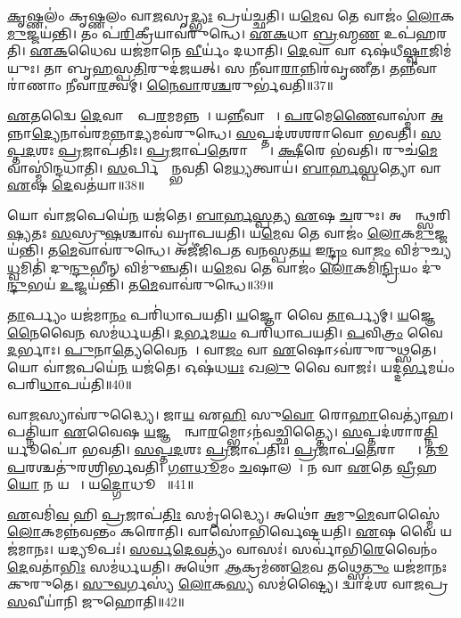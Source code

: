 \ul{𑌕𑍃}𑌷𑍍𑌣𑌲𑌂॑ 𑌕𑍃𑌷𑍍𑌣𑌲𑌂 𑌵𑌾\ul{𑌜}𑌸𑍃\ul{𑌦𑍍𑌭𑍍𑌯𑌃} 𑌪𑍍𑌰𑌯॑𑌚𑍍𑌛𑌤𑌿।
𑌯\ul{𑌮𑍇}𑌵 𑌤𑍇 𑌵𑌾𑌜𑌂॑ \ul{𑌲𑍋}𑌕\ul{𑌮𑍁}𑌜𑍍𑌜𑌯॑𑌨𑍍𑌤𑌿।
𑌤𑌂 𑌪॑\ul{𑌰𑌿}𑌕𑍍𑌰𑍀𑌯𑌾𑌵॑𑌰𑍁𑌨𑍍𑌧𑍇।
\ul{𑌏}\ul{𑌕}𑌧𑌾 \ul{𑌬𑍍𑌰}𑌹𑍍𑌮\ul{𑌣} 𑌉𑌪॑𑌹𑌰𑌤𑌿।
\ul{𑌏}\ul{𑌕}𑌧𑍈𑌵 𑌯𑌜॑𑌮𑌾𑌨𑍇 \ul{𑌵𑍀}𑌰𑍍𑌯𑌂॑ 𑌦𑌧𑌾𑌤𑌿।
\ul{𑌦𑍇}𑌵𑌾 𑌵𑌾 𑌓𑌷॑𑌧𑍀\ul{𑌷𑍍𑌵𑌾}𑌜𑌿𑌮॑𑌯𑍁𑌃।
𑌤𑌾 𑌬𑍃\ul{𑌹}𑌸𑍍𑌪\ul{𑌤𑌿}𑌰𑍁𑌦॑𑌜𑌯𑌤𑍍।
𑌸 \ul{𑌨𑍀}𑌵𑌾\ul{𑌰𑌾}𑌨𑍍𑌨𑌿𑌰॑𑌵𑍃𑌣𑍀𑌤।
𑌤\ul{𑌨𑍍𑌨𑍀}𑌵𑌾𑌰𑌾॑𑌣𑌾𑌂 𑌨𑍀𑌵𑌾\ul{𑌰}𑌤𑍍𑌵𑌮𑍍।
\ul{𑌨𑍈}\ul{𑌵𑌾}𑌰\ul{𑌶𑍍𑌚}𑌰𑍁𑌰𑍍𑌭॑𑌵𑌤𑌿॥37॥

\ul{𑌏}𑌤𑌦𑍍𑌵𑍈 \ul{𑌦𑍇}𑌵𑌾𑌨𑌾𑌂᳚ 𑌪\ul{𑌰}𑌮𑌮𑌨𑍍𑌨𑌮𑍍᳚।
𑌯\ul{𑌨𑍍𑌨𑍀}𑌵𑌾𑌰𑌾𑌃᳚।
\ul{𑌪}\ul{𑌰}𑌮𑍇\ul{𑌣𑍈}𑌵𑌾𑌸𑍍𑌮𑌾॑ \ul{𑌅}𑌨𑍍𑌨𑌾\ul{𑌦𑍍𑌯𑍇}𑌨𑌾𑌵॑𑌰\ul{𑌮}𑌨𑍍𑌨𑌾\ul{𑌦𑍍𑌯}𑌮𑌵॑𑌰𑍁𑌨𑍍𑌧𑍇।
\ul{𑌸}𑌪𑍍𑌤𑌦॑𑌶𑌶𑌰𑌾𑌵𑍋 𑌭𑌵𑌤𑌿।
\ul{𑌸}\ul{𑌪𑍍𑌤}\ul{𑌦}𑌶𑌃 \ul{𑌪𑍍𑌰}𑌜𑌾𑌪॑𑌤𑌿𑌃।
\ul{𑌪𑍍𑌰}𑌜𑌾𑌪॑\ul{𑌤𑍇}𑌰𑌾𑌪𑍍𑌤𑍍𑌯𑍇᳚।
\ul{𑌕𑍍𑌷𑍀}𑌰𑍇 𑌭॑𑌵𑌤𑌿।
𑌰𑍁𑌚॑\ul{𑌮𑍇}𑌵𑌾𑌸𑍍𑌮𑌿॑𑌨𑍍𑌦𑌧𑌾𑌤𑌿।
\ul{𑌸}𑌰𑍍𑌪𑌿𑌷𑍍𑌵𑌾᳚𑌨𑍍𑌭𑌵𑌤𑌿 𑌮𑍇\ul{𑌧𑍍𑌯}𑌤𑍍𑌵𑌾𑌯॑।
\ul{𑌬𑌾}\ul{𑌰𑍍}\ul{𑌹}\ul{𑌸𑍍𑌪}𑌤𑍍𑌯𑍋 𑌵𑌾 \ul{𑌏}𑌷 \ul{𑌦𑍇}𑌵𑌤॑𑌯𑌾॥38॥

𑌯𑍋 𑌵𑌾॑\ul{𑌜}𑌪𑍇𑌯𑍇॑\ul{𑌨} 𑌯𑌜॑𑌤𑍇।
\ul{𑌬𑌾}\ul{𑌰𑍍}\ul{𑌹}\ul{𑌸𑍍𑌪}𑌤𑍍𑌯 \ul{𑌏}𑌷 \ul{𑌚}𑌰𑍁𑌃।
𑌅𑌶𑍍𑌵𑌾᳚𑌨𑍍𑌥𑍍𑌸𑌰𑌿\ul{𑌷𑍍𑌯}𑌤𑌃 \ul{𑌸}𑌸𑍍𑌰𑍁\ul{𑌷}𑌶𑍍𑌚𑌾𑌵॑ 𑌘𑍍𑌰𑌾𑌪𑌯𑌤𑌿।
𑌯\ul{𑌮𑍇}𑌵 𑌤𑍇 𑌵𑌾𑌜𑌂॑ \ul{𑌲𑍋}𑌕\ul{𑌮𑍁}𑌜𑍍𑌜𑌯॑𑌨𑍍𑌤𑌿।
𑌤\ul{𑌮𑍇}𑌵𑌾𑌵॑𑌰𑍁𑌨𑍍𑌧𑍇।
𑌅𑌜𑍀॑𑌜𑌿𑌪𑌤 𑌵𑌨𑌸𑍍𑌪𑌤\ul{𑌯} 𑌇\ul{𑌨𑍍𑌦𑍍𑌰𑌂} 𑌵𑌾\ul{𑌜𑌂} 𑌵𑌿𑌮𑍁॑𑌚𑍍𑌯\ul{𑌧𑍍𑌵}𑌮𑌿𑌤𑌿॑ 𑌦𑍁\ul{𑌨𑍍𑌦𑍁}𑌭𑍀𑌨𑍍 𑌵𑌿𑌮𑍁॑𑌞𑍍𑌚𑌤𑌿।
𑌯\ul{𑌮𑍇}𑌵 𑌤𑍇 𑌵𑌾𑌜𑌂॑ \ul{𑌲𑍋}𑌕𑌮𑌿॑\ul{𑌨𑍍𑌦𑍍𑌰𑌿}𑌯𑌂 𑌦𑍁॑\ul{𑌨𑍍𑌦𑍁}𑌭𑌯॑ \ul{𑌉}𑌜𑍍𑌜𑌯॑𑌨𑍍𑌤𑌿।
𑌤\ul{𑌮𑍇}𑌵𑌾𑌵॑𑌰𑍁𑌨𑍍𑌧𑍇॥39॥

\ul{𑌤𑌾}𑌰𑍍𑌪𑍍𑌯𑌂 𑌯𑌜॑𑌮𑌾\ul{𑌨𑌂} 𑌪𑌰𑌿॑𑌧𑌾𑌪𑌯𑌤𑌿।
\ul{𑌯}𑌜𑍍𑌞𑍋 𑌵𑍈 \ul{𑌤𑌾}𑌰𑍍𑌪𑍍𑌯𑌮𑍍।
\ul{𑌯}𑌜𑍍𑌞𑍇\ul{𑌨𑍈}𑌵𑍈\ul{𑌨}\ul{} 𑌸𑌮॑𑌰𑍍𑌧𑌯𑌤𑌿।
\ul{𑌦}\ul{𑌰𑍍𑌭}𑌮\ul{𑌯𑌂} 𑌪𑌰𑌿॑𑌧𑌾𑌪𑌯𑌤𑌿।
\ul{𑌪}𑌵𑌿\ul{𑌤𑍍𑌰𑌂} 𑌵𑍈 \ul{𑌦}𑌰𑍍𑌭𑌾𑌃।
\ul{𑌪𑍁}𑌨𑌾\ul{𑌤𑍍𑌯𑍇}𑌵𑍈𑌨𑌮𑍍᳚।
𑌵𑌾\ul{𑌜𑌂} 𑌵𑌾 \ul{𑌏}𑌷𑍋\-𑌽𑌵॑𑌰𑍁𑌰𑍁𑌥𑍍𑌸𑌤𑍇।
𑌯𑍋 𑌵𑌾॑\ul{𑌜}𑌪𑌯𑍇॑\ul{𑌨} 𑌯𑌜॑𑌤𑍇।
𑌓𑌷॑𑌧\ul{𑌯𑌃} 𑌖\ul{𑌲𑍁} 𑌵𑍈 𑌵𑌾𑌜𑌃॑।
𑌯𑌦𑍍𑌦॑\ul{𑌰𑍍𑌭}𑌮𑌯𑌂॑ 𑌪𑌰𑌿\ul{𑌧𑌾}𑌪𑌯॑𑌤𑌿॥40॥

𑌵𑌾\ul{𑌜}𑌸𑍍𑌯𑌾𑌵॑𑌰𑍁𑌦𑍍𑌧𑍍𑌯𑍈।
𑌜𑌾\ul{𑌯} 𑌏\ul{𑌹𑌿} 𑌸𑍁\ul{𑌵𑍋} 𑌰𑍋\ul{𑌹𑌾}𑌵𑍇𑌤𑍍𑌯𑌾॑𑌹।
𑌪𑌤𑍍𑌨𑌿॑𑌯𑌾 \ul{𑌏}𑌵𑍈𑌷 \ul{𑌯}𑌜𑍍𑌞𑌸𑍍𑌯𑌾᳚𑌨𑍍𑌵𑌾\ul{𑌰}𑌮𑍍𑌭𑍋\-𑌽𑌨॑𑌵𑌚𑍍𑌛𑌿𑌤𑍍𑌤𑍍𑌯𑍈।
\ul{𑌸}𑌪𑍍𑌤𑌦॑𑌶𑌾𑌰\ul{𑌤𑍍𑌨𑌿}𑌰𑍍𑌯𑍂𑌪𑍋॑ 𑌭𑌵𑌤𑌿।
\ul{𑌸}\ul{𑌪𑍍𑌤}\ul{𑌦}𑌶𑌃 \ul{𑌪𑍍𑌰}𑌜𑌾𑌪॑𑌤𑌿𑌃।
\ul{𑌪𑍍𑌰}𑌜𑌾𑌪॑\ul{𑌤𑍇}𑌰𑌾𑌪𑍍𑌤𑍍𑌯𑍈᳚।
\ul{𑌤𑍂}\ul{𑌪}𑌰𑌶𑍍𑌚𑌤𑍁॑𑌰𑌶𑍍𑌰𑌿𑌰𑍍𑌭𑌵𑌤𑌿।
\ul{𑌗𑍗}\ul{𑌧𑍂}𑌮𑌂 \ul{𑌚}𑌷𑌾𑌲𑌮𑍍᳚।
𑌨 𑌵𑌾 \ul{𑌏}𑌤𑍇 \ul{𑌵𑍍𑌰𑍀}𑌹\ul{𑌯𑍋} 𑌨 𑌯𑌵𑌾𑌃᳚।
𑌯\ul{𑌦𑍍𑌗𑍋}𑌧𑍂𑌮𑌾𑌃᳚॥41॥

\ul{𑌏}𑌵𑌮𑌿॑\ul{𑌵} 𑌹𑌿 \ul{𑌪𑍍𑌰}𑌜𑌾𑌪॑\ul{𑌤𑌿𑌃} 𑌸𑌮𑍃॑𑌦𑍍𑌧𑍍𑌯𑍈।
𑌅𑌥𑍋॑ \ul{𑌅}𑌮𑍁\ul{𑌮𑍇}𑌵𑌾𑌸𑍍𑌮𑍈॑ \ul{𑌲𑍋}𑌕𑌮𑌨𑍍𑌨॑𑌵𑌨𑍍𑌤𑌂 𑌕𑌰𑍋𑌤𑌿।
𑌵𑌾𑌸𑍋॑𑌭𑌿𑌰𑍍𑌵𑍇𑌷𑍍𑌟𑌯𑌤𑌿।
\ul{𑌏}𑌷 𑌵𑍈 𑌯𑌜॑𑌮𑌾𑌨𑌃।
𑌯𑌦𑍍𑌯𑍂𑌪𑌃॑।
\ul{𑌸}\ul{𑌰𑍍𑌵}\ul{𑌦𑍇}\ul{𑌵}𑌤𑍍𑌯𑌂॑ 𑌵𑌾𑌸𑌃॑।
𑌸𑌰𑍍𑌵𑌾॑𑌭𑌿\ul{𑌰𑍇}𑌵𑍈𑌨𑌂॑ \ul{𑌦𑍇}𑌵𑌤𑌾॑\ul{𑌭𑌿𑌃} 𑌸𑌮॑𑌰𑍍𑌧𑌯𑌤𑌿।
𑌅𑌥𑍋॑ \ul{𑌆}𑌕𑍍𑌰𑌮॑𑌣\ul{𑌮𑍇}𑌵 𑌤𑌥𑍍𑌸𑍇\ul{𑌤𑍁𑌂} 𑌯𑌜॑𑌮𑌾𑌨𑌃 𑌕𑍁𑌰𑍁𑌤𑍇।
\ul{𑌸𑍁}\ul{𑌵}𑌰𑍍𑌗𑌸𑍍𑌯॑ \ul{𑌲𑍋}𑌕\ul{𑌸𑍍𑌯} 𑌸𑌮॑𑌷𑍍𑌟𑍍𑌯𑍈।
𑌦𑍍𑌵𑌾𑌦॑𑌶 𑌵𑌾𑌜𑌪𑍍𑌰\ul{𑌸}𑌵𑍀𑌯𑌾॑𑌨𑌿 𑌜𑍁𑌹𑍋𑌤𑌿॥42॥

